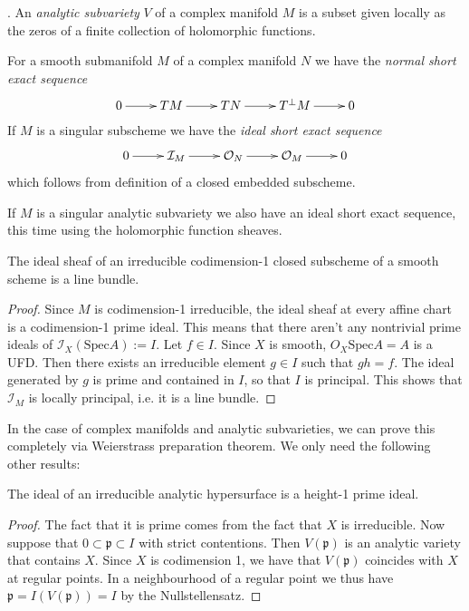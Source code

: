 \begin{definition}
\label{definition-analytic-subvariety}
\cite{gri}. An {\it analytic subvariety} $V$ of a complex manifold $M$ is a
subset given locally as the zeros of a finite collection of holomorphic
functions.
\end{definition}

For a smooth submanifold $M$ of a complex manifold $N$ we have the {\it normal 
short exact sequence}
$$
\xymatrix{
0\ar[r]&TM\ar[r]&TN\ar[r]&T^\perp M\ar[r]&0
}
$$
If $M$ is a singular subscheme we have the {\it ideal short exact sequence}
$$
\xymatrix{
0\ar[r]&\mathcal{I}_M\ar[r]&\mathcal{O}_N\ar[r]&\mathcal{O}_M\ar[r]&0
}
$$
which follows from definition of a closed embedded subscheme.

If $M$ is a singular analytic subvariety we also have an ideal short exact
sequence, this time using the holomorphic function sheaves.

\begin{lemma}
\label{lemma-ideal-sheaf-is-line-bundle-schemes}
The ideal sheaf of an irreducible codimension-1 closed subscheme of a smooth
scheme is a line bundle.
\end{lemma}

\begin{proof}
Since $M$ is codimension-1 irreducible, the ideal sheaf at every affine chart is
a codimension-1 prime ideal. This means that there aren't any nontrivial prime
ideals of $\mathcal{I}_X(\text{Spec}A):=I$. Let $f\in I$.
Since $X$ is smooth, $O_X\text{Spec}A=A$ is a UFD. Then there exists an
irreducible element $g\in I$ such that $gh=f$. The ideal generated by $g$ is
prime and contained in $I$, so that $I$ is principal. This shows that
$\mathcal{I}_M$ is locally principal, i.e. it is a line bundle.
\end{proof}

In the case of complex manifolds and analytic subvarieties, we can prove this
completely via Weierstrass preparation theorem. We only need the following other
results:

\begin{lemma}
\label{lemma-ideal-of-irreducible-hypersurface-is-height-1-prime}
The ideal of an irreducible analytic hypersurface is a height-1 prime ideal.
\end{lemma}

\begin{proof}
The fact that it is prime comes from the fact that $X$ is irreducible. Now
suppose that $0 \subset \mathfrak{p} \subset I$ with strict contentions. Then
$V(\mathfrak{p})$ is an analytic variety that contains $X$. Since $X$ is
codimension 1, we have that $V(\mathfrak{p})$ coincides with $X$ at regular
points. In a neighbourhood of a regular point we thus have 
$\mathfrak{p}=I(V(\mathfrak{p}))=I$ by the Nullstellensatz.
\end{proof}


